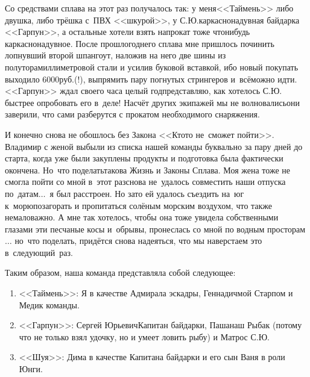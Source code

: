 Со средствами сплава на этот раз получалось так: у меня\mdash <<Таймень>> либо двушка, либо трёшка с~ПВХ <<шкурой>>, у С.Ю.\mdash каркасно\sdash надувная байдарка <<Гарпун>>, а остальные хотели взять напрокат тоже что\sdash нибудь каркасно\sdash надувное. После прошлогоднего сплава мне пришлось починить лопнувший второй шпангоут, наложив на него две шины из полуторамиллиметровой стали и усилив буковой вставкой, ибо новый покупать выходило 6000\thinspace руб.(!), выпрямить пару погнутых стрингеров и~всё\mdash можно идти. <<Гарпун>> ждал своего часа целый год\mdash представляю, как хотелось С.Ю. быстрее опробовать его в~деле! Насчёт других экипажей мы не волновались\mdash они заверили, что сами разберутся с прокатом необходимого снаряжения. 

И конечно снова не обошлось без Закона <<Кто\sdash то не~сможет пойти>>. Владимир с женой выбыли из списка нашей команды буквально за пару дней до старта, когда уже были закуплены продукты и подготовка была фактически окончена. Но~что поделать\mdash такова Жизнь и Законы Сплава. Моя жена тоже не смогла пойти со мной в~этот раз\mdash снова не~удалось совместить наши отпуска по~датам$\ldots$~я был расстроен. Но зато ей удалось съездить на~юг к~морю\mdash позагорать и пропитаться солёным морским воздухом, что также немаловажно. А мне так хотелось, чтобы она тоже увидела собственными глазами эти песчаные косы и~обрывы, пронеслась со мной по водным просторам$\ldots$ но~что поделать, придётся снова надеяться, что мы наверстаем это в~следующий~раз. 

Таким образом, наша команда представляла собой следующее:
\vspace{-3mm}
\begin{enumerate}
	\item <<Таймень>>: Я в качестве Адмирала эскадры, Геннадич\mdash мой Старпом и Медик команды.
	\item <<Гарпун>>: Сергей Юрьевич\mdash  Капитан байдарки, Паша\mdash наш Рыбак (потому что не только взял удочку, но и умеет ловить рыбу) и Матрос С.Ю.
	\item <<Шуя>>: Дима в качестве Капитана байдарки и его сын Ваня в роли Юнги.
\end{enumerate}


\begin{center}
\end{center}
